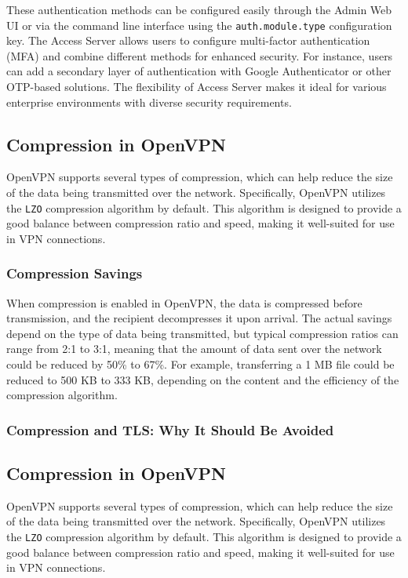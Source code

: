 These authentication methods can be configured easily through the Admin Web UI or via the command line interface using the \texttt{auth.module.type} configuration key. The Access Server allows users to configure multi-factor authentication (MFA) and combine different methods for enhanced security. For instance, users can add a secondary layer of authentication with Google Authenticator or other OTP-based solutions. The flexibility of Access Server makes it ideal for various enterprise environments with diverse security requirements.

\subsection{Compression in OpenVPN}

OpenVPN supports several types of compression, which can help reduce the size of the data being transmitted over the network. Specifically, OpenVPN utilizes the \texttt{LZO} compression algorithm by default. This algorithm is designed to provide a good balance between compression ratio and speed, making it well-suited for use in VPN connections.

\subsubsection{Compression Savings}

When compression is enabled in OpenVPN, the data is compressed before transmission, and the recipient decompresses it upon arrival. The actual savings depend on the type of data being transmitted, but typical compression ratios can range from 2:1 to 3:1, meaning that the amount of data sent over the network could be reduced by 50\% to 67\%. For example, transferring a 1 MB file could be reduced to 500 KB to 333 KB, depending on the content and the efficiency of the compression algorithm.

\subsubsection{Compression and TLS: Why It Should Be Avoided}

\subsection{Compression in OpenVPN}

OpenVPN supports several types of compression, which can help reduce the size of the data being transmitted over the network. Specifically, OpenVPN utilizes the \texttt{LZO} compression algorithm by default. This algorithm is designed to provide a good balance between compression ratio and speed, making it well-suited for use in VPN connections.

